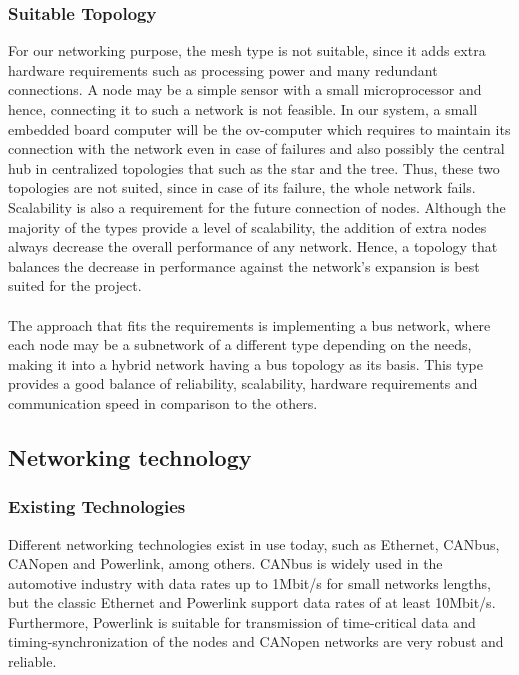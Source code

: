 \subsubsection{Suitable Topology}
For our networking purpose, the mesh type is not suitable, since it adds extra hardware requirements such as processing power and many redundant connections.
A node may be a simple sensor with a small microprocessor and hence, connecting it to such a network is not feasible.
In our system, a small embedded board computer will be the ov-computer which requires to maintain its connection with the network even in case of failures and also possibly the central hub in centralized topologies that such as the star and the tree.
Thus, these two topologies are not suited, since in case of its failure, the whole network fails.
Scalability is also a requirement for the future connection of nodes.
Although the majority of the types provide a level of scalability, the addition of extra nodes always decrease the overall performance of any network.
Hence, a topology that balances the decrease in performance against the network's expansion is best suited for the project.\\\\
The approach that fits the requirements is implementing a bus network, where each node may be a subnetwork of a different type depending on the needs, making it into a hybrid network having a bus topology as its basis.
This type provides a good balance of reliability, scalability, hardware requirements and communication speed in comparison to the others.

\subsection{Networking technology}

\subsubsection{Existing Technologies}
Different networking technologies exist in use today, such as Ethernet, CANbus, CANopen and Powerlink, among others.
CANbus is widely used in the automotive industry with data rates up to 1Mbit/s for small networks lengths, but the classic Ethernet and Powerlink support data rates of at least 10Mbit/s.
Furthermore, Powerlink is suitable for transmission of time-critical data and timing-synchronization of the nodes and CANopen networks are very robust and reliable.
